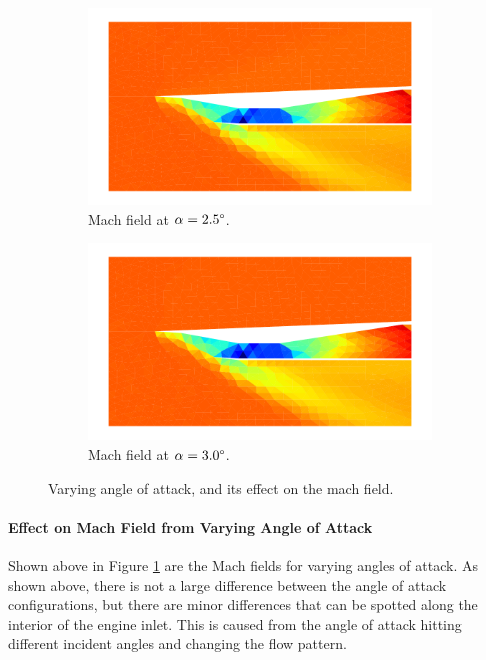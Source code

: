 \begin{figure}[h]
    \begin{subfigure}[h]{0.48\linewidth}
        \centering
        \includegraphics[width=\linewidth]{rep/q5/mach_a25.pdf}
        \caption{Mach field at $\alpha=2.5\degree$.}
    \end{subfigure}
    \begin{subfigure}[h]{0.48\linewidth}
        \centering
        \includegraphics[width=\linewidth]{rep/q5/mach_a30.pdf}
        \caption{Mach field at $\alpha=3.0\degree$.}
    \end{subfigure}
    \caption[Mach Field with Varying Angle of Attack]{Varying angle of attack, and its effect on the mach field.}
    \label{fig:mach_fields}
\end{figure}

\paragraph{Effect on Mach Field from Varying Angle of Attack} Shown above in Figure \ref{fig:mach_fields} are the Mach fields for varying angles of attack. As shown above, there is not a large difference between the angle of attack configurations, but there are minor differences that can be spotted along the interior of the engine inlet. This is caused from the angle of attack hitting different incident angles and changing the flow pattern.


